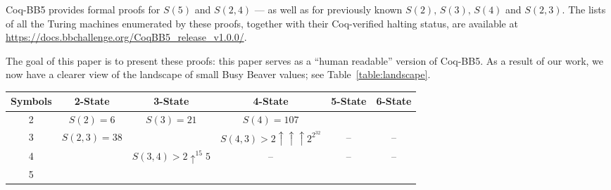 \documentclass[a4paper,british]{article}
\theoremstyle{definition} %
\numberwithin{equation}{section}
\theoremstyle{definition} %
\newcommand{\BBtheFifth}{47{,}176{,}870}
\newcommand{\BBTxF}{3{,}932{,}964}
\newcommand{\CoqBB}{Coq-BB5\xspace}
\begin{document}
\CoqBB provides formal proofs for $S(5)$ and $S(2,4)$ --- as well as for previously known $S(2),\,S(3),\,S(4)$ and $S(2,3)$. The lists of all the Turing machines enumerated by these proofs, together with their Coq-verified halting status, are available at \url{https://docs.bbchallenge.org/CoqBB5_release_v1.0.0/}.

The goal of this paper is to present these proofs: this paper serves as a ``human readable'' version of \CoqBB. As a result of our work, we now have a clearer view of the landscape of small Busy Beaver values; see Table~\ref{table:landscape}.


\setlength{\fboxrule}{1.2pt}
\begin{table}[h]
    \centering
    \small
    \renewcommand{\arraystretch}{1.3}
    \setlength{\tabcolsep}{5pt}  %
    \begin{tabular}{c|ccccc}
        \hline
        \textbf{Symbols} & \textbf{2-State}                                                           & \textbf{3-State} & \textbf{4-State} & \textbf{5-State} & \textbf{6-State} \\
        \hline
        2                & \cellcolor{green!20}$S(2) = 6$ \cite{Rado_1962}
                         & \cellcolor{green!20}$S(3) = 21$ \cite{Lin1963}
                         & \cellcolor{green!20}$S(4) = 107$ \cite{Brady83}
                         & \cellcolor{green!50}{$S(5) = \BBtheFifth$}
                         & \cellcolor{orange!50}{$S(6) > 2 \uparrow \uparrow \uparrow 5$}                                                                                         \\
        \hline
        3                & \cellcolor{green!20}$S(2,3) = 38$ \cite{LafittePapazian2007}
                         & \cellcolor{orange!50}{$S(3,3) > 10^{17}$}
                         & \cellcolor{orange!20}$S(4,3) > 2 \uparrow \uparrow \uparrow 2^{2^{{32}}} $
                         & --                                                                         & --                                                                        \\
        \hline
        4                & \cellcolor{green!50}{$S(2,4) = \BBTxF$}
                         & \cellcolor{orange!20}$S(3,4) > 2 \uparrow^{15} 5 $
                         & --                                                                         & --               & --                                                     \\
        \hline
        5                & \cellcolor{orange!50}{$S(2,5) > 10 \uparrow \uparrow 4$}

\end{tabular}
\end{table}
\end{document}
